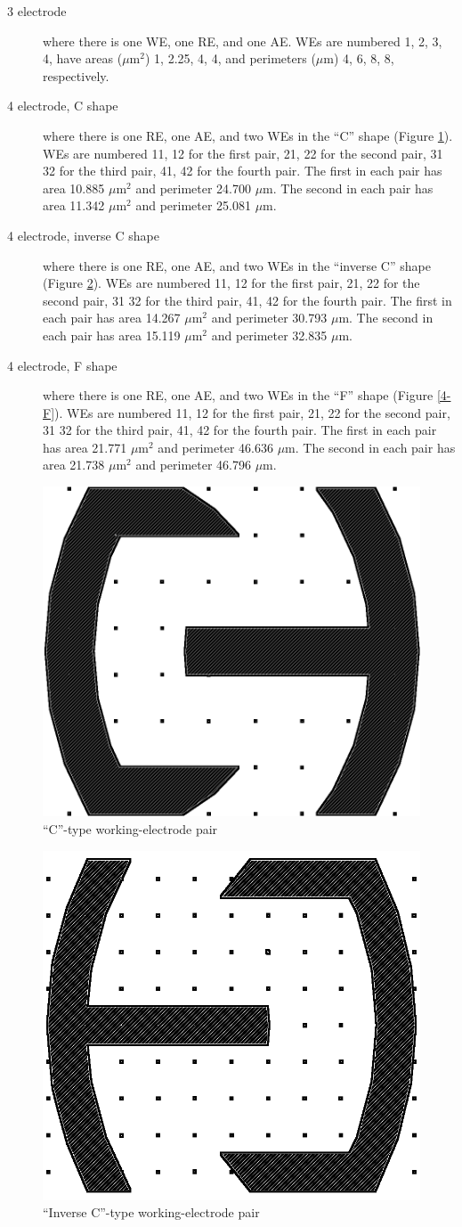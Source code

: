 \begin{description}
\item[3 electrode] where there is one WE, one RE, and one AE. WEs are numbered 1, 2, 3, 4, have areas ($\mu \mathrm{m}^2$) 1, 2.25, 4, 4, and perimeters ($\mu \mathrm{m}$) 4, 6, 8, 8, respectively.
\item[4 electrode, C shape] where there is one RE, one AE, and two WEs in the ``C'' shape (Figure \ref{4-C}). WEs are numbered 11, 12 for the first pair, 21, 22 for the second pair, 31 32 for the third pair, 41, 42 for the fourth pair. The first in each pair has area 10.885 $\mu \mathrm{m}^2$ and perimeter 24.700 $\mu \mathrm{m}$. The second in each pair has area 11.342 $\mu \mathrm{m}^2$ and perimeter 25.081 $\mu \mathrm{m}$.
\item[4 electrode, inverse C shape] where there is one RE, one AE, and two WEs in the ``inverse C'' shape (Figure \ref{4-I}). WEs are numbered 11, 12 for the first pair, 21, 22 for the second pair, 31 32 for the third pair, 41, 42 for the fourth pair. The first in each pair has area 14.267 $\mu \mathrm{m}^2$ and perimeter 30.793 $\mu \mathrm{m}$. The second in each pair has area 15.119 $\mu \mathrm{m}^2$ and perimeter 32.835 $\mu \mathrm{m}$.
\item[4 electrode, F shape] where there is one RE, one AE, and two WEs in the ``F'' shape (Figure \ref{4-F}). WEs are numbered 11, 12 for the first pair, 21, 22 for the second pair, 31 32 for the third pair, 41, 42 for the fourth pair. The first in each pair has area 21.771 $\mu \mathrm{m}^2$ and perimeter 46.636 $\mu \mathrm{m}$. The second in each pair has area 21.738 $\mu \mathrm{m}^2$ and perimeter 46.796 $\mu \mathrm{m}$.
\end{description}

\begin{figure}
	\centering
	\includegraphics[width=0.1\linewidth]{figures/4-C.png}
	\caption{``C''-type working-electrode pair}
	\label{4-C}
\end{figure}

\begin{figure}
	\centering
	\includegraphics[width=0.1\linewidth]{figures/4-I.png}
	\caption{``Inverse C''-type working-electrode pair}
	\label{4-I}
\end{figure}

